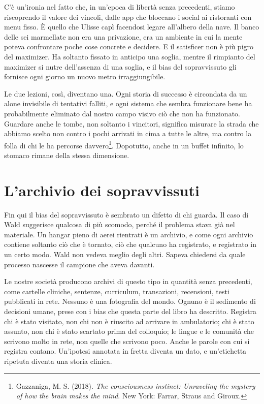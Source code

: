 C'è un'ironia nel fatto che, in un'epoca di libertà senza precedenti, stiamo riscoprendo il valore dei vincoli, dalle app che bloccano i social ai ristoranti con menu fisso. È quello che Ulisse capì facendosi legare all'albero della nave. Il banco delle sei marmellate non era una privazione, era un ambiente in cui la mente poteva confrontare poche cose concrete e decidere. E il satisficer non è più pigro del maximizer. Ha soltanto fissato in anticipo una soglia, mentre il rimpianto del maximizer si nutre dell'assenza di una soglia, e il bias del sopravvissuto gli fornisce ogni giorno un nuovo metro irraggiungibile.

Le due lezioni, così, diventano una. Ogni storia di successo è circondata da un alone invisibile di tentativi falliti, e ogni sistema che sembra funzionare bene ha probabilmente eliminato dal nostro campo visivo ciò che non ha funzionato. Guardare anche le tombe, non soltanto i vincitori, significa misurare la strada che abbiamo scelto non contro i pochi arrivati in cima a tutte le altre, ma contro la folla di chi le ha percorse davvero\footnote{Gazzaniga, M. S. (2018). \textit{The consciousness instinct: Unraveling the mystery of how the brain makes the mind}. New York: Farrar, Straus and Giroux.}. Dopotutto, anche in un buffet infinito, lo stomaco rimane della stessa dimensione.

\section{L'archivio dei sopravvissuti}
\label{sec:p2c30-archivio}

Fin qui il bias del sopravvissuto è sembrato un difetto di chi guarda. Il caso di Wald suggerisce qualcosa di più scomodo, perché il problema stava già nel materiale. Un hangar pieno di aerei rientrati è un archivio, e come ogni archivio contiene soltanto ciò che è tornato, ciò che qualcuno ha registrato, e registrato in un certo modo. Wald non vedeva meglio degli altri. Sapeva chiedersi da quale processo nascesse il campione che aveva davanti.

Le nostre società producono archivi di questo tipo in quantità senza precedenti, come cartelle cliniche, sentenze, curriculum, transazioni, recensioni, testi pubblicati in rete. Nessuno è una fotografia del mondo. Ognuno è il sedimento di decisioni umane, prese con i bias che questa parte del libro ha descritto. Registra chi è stato visitato, non chi non è riuscito ad arrivare in ambulatorio; chi è stato assunto, non chi è stato scartato prima del colloquio; le lingue e le comunità che scrivono molto in rete, non quelle che scrivono poco. Anche le parole con cui si registra contano. Un'ipotesi annotata in fretta diventa un dato, e un'etichetta ripetuta diventa una storia clinica.

